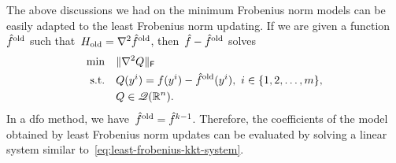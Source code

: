 The above discussions we had on the minimum Frobenius norm models can be easily adapted to the least Frobenius norm updating.
If we are given a function~$\objm[\text{old}]$ such that~$H_{\text{old}} = \nabla^2 \objm[\text{old}]$, then~$\objm - \objm[\text{old}]$ solves
\begin{subequations}
    \label{eq:symmetric-broyden-models-reformulation}
    \begin{align}
        \min        & \quad \norm{\nabla^2 Q}_{\mathsf{F}}\\
        \text{s.t.} & \quad Q(y^i) = \obj(y^i) - \objm[\text{old}](y^i), ~ i \in \set{1, 2, \dots, m},\\
                    & \quad Q \in \qpoly.
    \end{align}
\end{subequations}
In a \gls{dfo} method, we have~$\objm[\text{old}] = \objm[k - 1]$.
Therefore, the coefficients of the model obtained by least Frobenius norm updates can be evaluated by solving a linear system similar to~\cref{eq:least-frobenius-kkt-system}.

